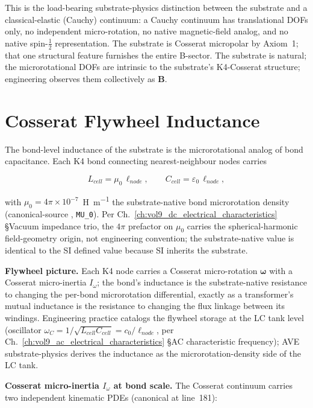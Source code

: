 This is the load-bearing substrate-physics distinction between the substrate and a classical-elastic (Cauchy) continuum: a Cauchy continuum has translational DOFs only, no independent micro-rotation, no native magnetic-field analog, and no native spin-$\tfrac{1}{2}$ representation. The substrate is Cosserat micropolar by Axiom~1; that one structural feature furnishes the entire B-sector. The substrate is natural; the microrotational DOFs are intrinsic to the substrate's K4-Cosserat structure; engineering observes them collectively as $\mathbf{B}$.

\section{Cosserat Flywheel Inductance}
\label{sec:vol9_cosserat_flywheel_inductance}

The bond-level inductance of the substrate is the microrotational analog of bond capacitance. Each K4 bond connecting nearest-neighbour nodes carries

\[
L_{cell} = \mu_0\, \ell_{node}, \qquad C_{cell} = \varepsilon_0\, \ell_{node},
\]

with $\mu_0 = 4\pi \times 10^{-7}$~\si{\henry\per\metre} the substrate-native bond microrotation density (canonical-source , \texttt{MU\_0}). Per Ch.~\ref{ch:vol9_dc_electrical_characteristics} \S Vacuum impedance trio, the $4\pi$ prefactor on $\mu_0$ carries the spherical-harmonic field-geometry origin, not engineering convention; the substrate-native value is identical to the SI defined value because SI inherits the substrate.

\textbf{Flywheel picture.} Each K4 node carries a Cosserat micro-rotation $\boldsymbol{\omega}$ with a Cosserat micro-inertia $I_\omega$; the bond's inductance is the substrate-native resistance to changing the per-bond microrotation differential, exactly as a transformer's mutual inductance is the resistance to changing the flux linkage between its windings. Engineering practice catalogs the flywheel storage at the LC tank level (oscillator $\omega_C = 1/\sqrt{L_{cell} C_{cell}} = c_0/\ell_{node}$, per Ch.~\ref{ch:vol9_ac_electrical_characteristics} \S AC characteristic frequency); AVE substrate-physics derives the inductance as the microrotation-density side of the LC tank.

\textbf{Cosserat micro-inertia $I_\omega$ at bond scale.} The Cosserat continuum carries two independent kinematic PDEs (canonical at  line~181):

